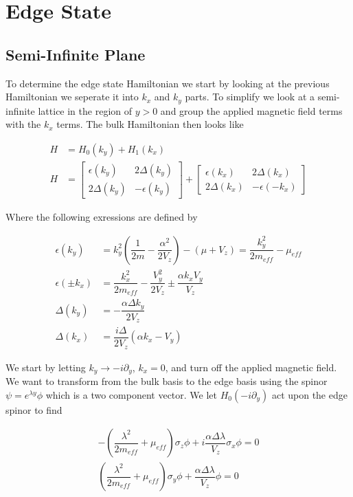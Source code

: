 \chapter{Edge State}
\section{Semi-Infinite Plane}

To determine the edge state Hamiltonian we start by looking at the previous Hamiltonian we seperate it into $k_x$ and $k_y$ parts. To simplify we look at a semi-infinite lattice in the region of $y>0$ and group the applied magnetic field terms with the $k_x$ terms. The bulk Hamiltonian then looks like

\begin{align}
  H &= H_0(k_y) + H_1(k_x) \\
  H &= 
  \begin{bmatrix}
    \epsilon(k_y) & 2\Delta(k_y) \\
    2\Delta(k_y) & -\epsilon(k_y)
  \end{bmatrix}
  +
  \begin{bmatrix}
    \epsilon(k_x) & 2\Delta(k_x) \\
    2\Delta(k_x) & -\epsilon(-k_x)
  \end{bmatrix}
\end{align}

Where the following exressions are defined by

\begin{align}
  \epsilon(k_y) &= k_y^2\left(\dfrac{1}{2m}-\dfrac{\alpha^2}{2V_z}\right) - (\mu +V_z) = \dfrac{k_y^2}{2m_{eff}} - \mu_{eff} \\
  \epsilon(\pm k_x) &= \dfrac{k_x^2}{2m_{eff}} -\dfrac{V_y^2}{2V_z} \pm \dfrac{\alpha k_x V_y}{V_z} \\
  \Delta(k_y) &= -\dfrac{\alpha \Delta k_y}{2V_z} \\
  \Delta(k_x) &= \dfrac{i\Delta}{2V_z}(\alpha k_x - V_y)
\end{align}

We start by letting $k_y \rightarrow -i\partial_y$, $k_x=0$, and turn off the applied magnetic field. We want to transform from the bulk basis to the edge basis using the spinor $\psi = e^{\lambda y}\phi$ which is a two component vector. We let $H_0(-i\partial_y)$ act upon the edge spinor to find

\begin{align}
  -\left(\dfrac{\lambda^2}{2m_{eff}}+\mu_{eff}\right)\sigma_z\phi+i\dfrac{\alpha\Delta\lambda}{V_z}\sigma_x\phi = 0 \\
  \left(\dfrac{\lambda^2}{2m_{eff}}+\mu_{eff}\right)\sigma_y\phi+\dfrac{\alpha\Delta\lambda}{V_z}\phi = 0
\end{align}

